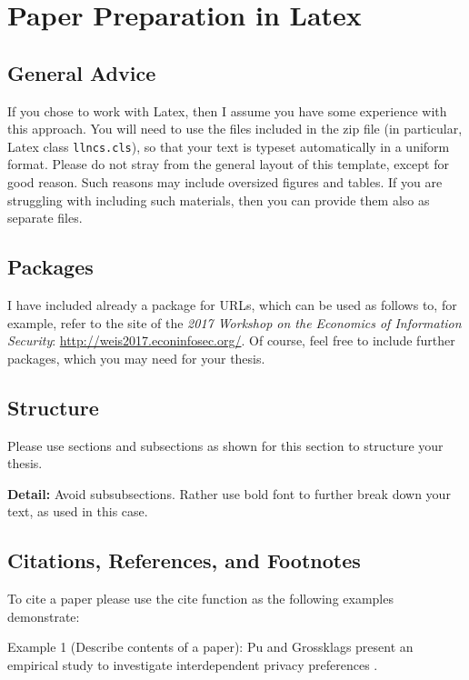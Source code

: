 \documentclass[runningheads,a4paper]{llncs}
\begin{document}
\section{Paper Preparation in Latex}

\subsection{General Advice}

If you chose to work with Latex, then I assume you have some experience with this approach. You will need to use the files included in the zip file (in particular, Latex class \texttt{llncs.cls}), so that your text is typeset automatically in a uniform format. Please do not stray from the general layout of this template, except for good reason. Such reasons may include oversized figures and tables. If you are struggling with including such materials, then you can provide them also as separate files.

\subsection{Packages}

I have included already a package for URLs, which can be used as follows to, for example, refer to the site of the \textit{2017 Workshop on the Economics of Information Security}:  \url{http://weis2017.econinfosec.org/}. Of course, feel free to include further packages, which you may need for your thesis.

\subsection{Structure}

Please use sections and subsections as shown for this section to structure your thesis. 

\textbf{Detail:} Avoid subsubsections. Rather use bold font to further break down your text, as used in this case.

\subsection{Citations, References, and Footnotes}
\label{sub:citations}

To cite a paper please use the cite function as the following examples demonstrate:

Example 1 (Describe contents of a paper): Pu and Grossklags present an empirical study to investigate interdependent privacy preferences \cite{Pu2016}. 
\end{document}
